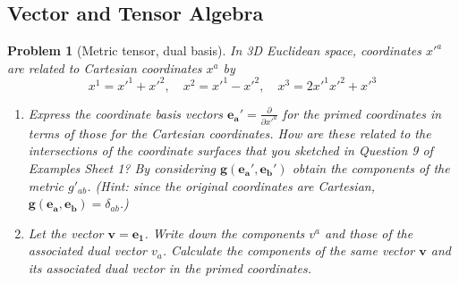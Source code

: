 \documentclass[a4paper]{article}
\theoremstyle{new}
\newtheorem{qns}{Problem}[section]
\begin{document}
\subsection*{Vector and Tensor Algebra}
\begin{qns}[Metric tensor, dual basis]
In 3D Euclidean space, coordinates $x'^a$ are related to Cartesian coordinates $x^a$ by
$$x^1=x'^1+x'^2,\quad  x^2=x'^1-x'^2,\quad x^3=2x'^1x'^2+x'^3$$
\begin{enumerate}[label=(\alph*)]
\item Express the coordinate basis vectors $\mathbf{e_a'}=\frac{\partial}{\partial x'^a}$ for the primed coordinates in terms of those for the Cartesian coordinates. How are these related to the intersections of the coordinate surfaces that you sketched in Question 9 of Examples Sheet 1? By considering $\mathbf{g}(\mathbf{e_a'},\mathbf{e_b'})$ obtain the components of the metric $g'_{ab}$. (Hint: since the original coordinates are Cartesian, $\mathbf{g}(\mathbf{e_a},\mathbf{e_b})=\delta_{ab}$.) 
\item Let the vector $\mathbf{v}=\mathbf{e_1}$. Write down the components $v^a$ and those of the associated dual vector $v_a$. Calculate the components of the same vector $\mathbf{v}$ and its associated dual vector in the primed coordinates. 
\end{enumerate}
\end{qns}
\end{document}
